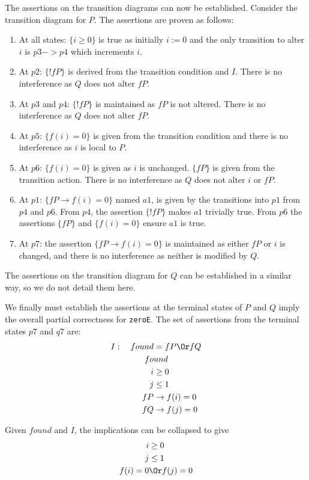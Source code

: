 \documentclass[12pt,a4paper]{scrartcl}
\begin{document}
The assertions on the transition diagrams can now be established. Consider the transition diagram for $P$. The assertions are proven as follows:
\begin{enumerate}
    \item At all states: $\{i\ge0\}$ is true as initially $i:=0$ and the only transition to alter $i$ is $p3 -> p4$ which increments $i$.
    \item At $p2$: $\{!fP\}$ is derived from the transition condition and $I$. There is no interference as $Q$ does not alter $fP$.
    \item At $p3$ and $p4$: $\{!fP\}$ is maintained as $fP$ is not altered. There is no interference as $Q$ does not alter $fP$.
    \item At $p5$: $\{f(i)=0\}$ is given from the transition condition and there is no interference as $i$ is local to $P$.
    \item At $p6$: $\{f(i)=0\}$ is given as $i$ is unchanged. $\{fP\}$ is given from the transition action. There is no interference as $Q$ does not alter $i$ or $fP$.
    \item At $p1$: $\{fP \rightarrow f(i)=0\}$ named $a1$, is given by the transitions into $p1$ from $p4$ and $p6$.
          From $p4$, the assertion $\{!fP\}$ makes $a1$ trivially true.
          From $p6$ the assertions $\{fP\}$ and $\{f(i)=0\}$ ensure $a1$ is true.
    \item At $p7$: the assertion $\{fP \rightarrow f(i)=0\}$ is maintained as either $fP$ or $i$ is changed, and there is no interference as neither is modified by $Q$.
\end{enumerate}

The assertions on the transition diagram for $Q$ can be established in a similar way, so we do not detail them here.

We finally must establish the assertions at the terminal states of $P$ and $Q$ imply the overall partial correctness for \texttt{zeroE}.
The set of assertions from the terminal states $p7$ and $q7$ are:
\begin{align*}
    I: \quad found &= fP \Or fQ \\
    fo&und \\
    i &\ge 0 \\
    j &\le 1 \\
    fP &\rightarrow f(i) = 0 \\
    fQ &\rightarrow f(j) = 0
\end{align*}

Given $found$ and $I$, the implications can be collapsed to give
\begin{align*}
    i &\ge 0 \\
    j &\le 1 \\
    f(i) = 0 &\Or f(j) = 0
\end{align*}
\end{document}
